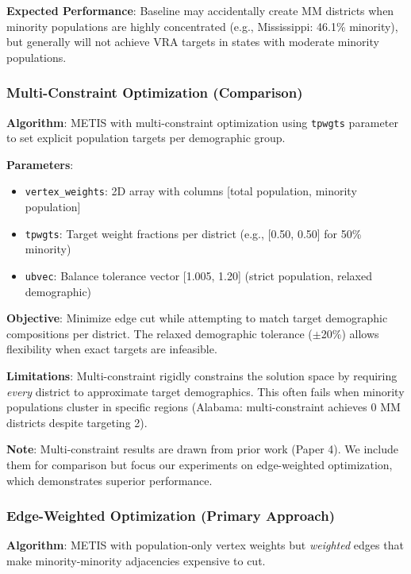 \textbf{Expected Performance}: Baseline may accidentally create MM districts when minority populations are highly concentrated (e.g., Mississippi: 46.1\% minority), but generally will not achieve VRA targets in states with moderate minority populations.

\subsubsection{Multi-Constraint Optimization (Comparison)}

\textbf{Algorithm}: METIS with multi-constraint optimization using \texttt{tpwgts} parameter to set explicit population targets per demographic group.

\textbf{Parameters}:
\begin{itemize}
    \item \texttt{vertex\_weights}: 2D array with columns [total population, minority population]
    \item \texttt{tpwgts}: Target weight fractions per district (e.g., [0.50, 0.50] for 50\% minority)
    \item \texttt{ubvec}: Balance tolerance vector [1.005, 1.20] (strict population, relaxed demographic)
\end{itemize}

\textbf{Objective}: Minimize edge cut while attempting to match target demographic compositions per district. The relaxed demographic tolerance ($\pm$20\%) allows flexibility when exact targets are infeasible.

\textbf{Limitations}: Multi-constraint rigidly constrains the solution space by requiring \emph{every} district to approximate target demographics. This often fails when minority populations cluster in specific regions (Alabama: multi-constraint achieves 0 MM districts despite targeting 2).

\textbf{Note}: Multi-constraint results are drawn from prior work (Paper 4). We include them for comparison but focus our experiments on edge-weighted optimization, which demonstrates superior performance.

\subsubsection{Edge-Weighted Optimization (Primary Approach)}

\textbf{Algorithm}: METIS with population-only vertex weights but \emph{weighted} edges that make minority-minority adjacencies expensive to cut.

